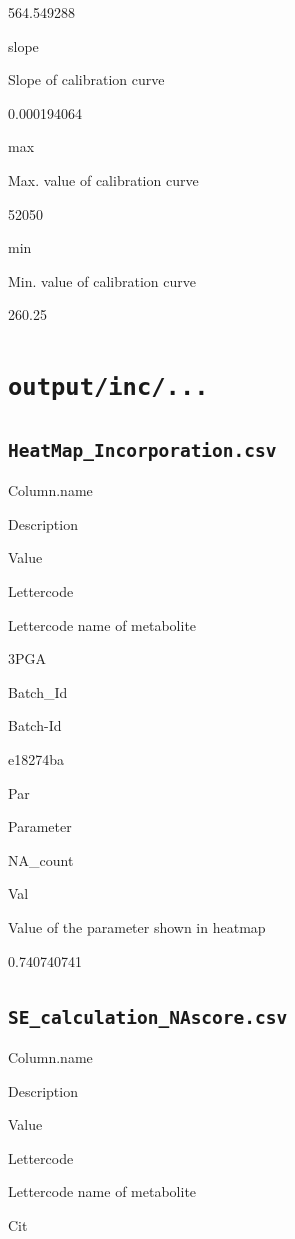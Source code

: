 \documentclass[]{book}
\theoremstyle{definition}
\theoremstyle{definition}
\theoremstyle{definition}
\theoremstyle{remark}
\begin{document}
564.549288

slope

Slope of calibration curve

0.000194064

max

Max. value of calibration curve

52050

min

Min. value of calibration curve

260.25

\section{\texorpdfstring{\texttt{output/inc/...}}{output/inc/...}}\label{outputinc...}

\subsection{\texorpdfstring{\texttt{HeatMap\_Incorporation.csv}}{HeatMap\_Incorporation.csv}}\label{heatmap_incorporation.csv}

Column.name

Description

Value

Lettercode

Lettercode name of metabolite

3PGA

Batch\_Id

Batch-Id

e18274ba

Par

Parameter

NA\_count

Val

Value of the parameter shown in heatmap

0.740740741

\subsection{\texorpdfstring{\texttt{SE\_calculation\_NAscore.csv}}{SE\_calculation\_NAscore.csv}}\label{se_calculation_nascore.csv}

Column.name

Description

Value

Lettercode

Lettercode name of metabolite

Cit
\end{document}
